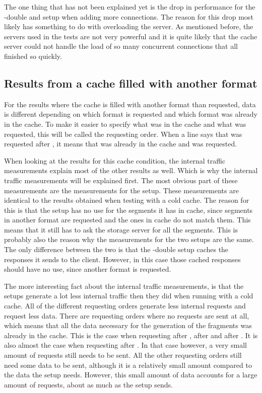 \documentclass[twoside,openright]{uva-bachelor-thesis}
\begin{document}
The one thing that has not been explained yet is the drop in performance for the
\lt-double and \cdn setup when adding more connections. The reason for this drop
most likely has something to do with overloading the server. As mentioned
before, the servers used in the tests are not very powerful and it is quite
likely that the cache server could not handle the load of so many concurrent
connections that all finished so quickly.

\subsection{Results from a cache filled with another format}
For the results where the cache is filled with another format than
requested, data is different depending on which format is requested and which
format was already in the cache. To make it easier to specify what was in the
cache and what was requested, this will be called the requesting order. When a
line says that \dash was requested after \iss, it means that \iss was already in
the cache and \dash was requested.

When looking at the results for this cache condition, the internal traffic
measurements explain most of the other results as well. Which is why the
internal traffic measurements will be explained first. The most obvious part of
these measurements are the measurements for the \cdn setup. These measurements
are identical to the results obtained when testing with a cold cache. The reason
for this is that the \cdn setup has no use for the segments it has in cache,
since segments in another format are requested and the ones in cache do not
match them. This means that it still has to ask the storage server for all the
segments. This is probably also the reason why the measurements for the two \lt
setups are the same. The only difference between the two is that the \lt-double
setup caches the responses it sends to the client. However, in this case those
cached responses should have no use, since another format is requested.

The more interesting fact about the internal traffic measurements, is that the
\lt setups generate a lot less internal traffic then they did when running with
a cold cache. All of the different requesting orders generate less internal
requests and request less data. There are requesting orders where no
requests are sent at all, which means that all the data necessary for the
generation of the fragments was already in the cache. This is the case when
requesting \dash after \iss, \iss after \dash and \hds after \hls. It is also
almost the case when requesting \hls after \hds. In that case however, a very
small amount of requests still needs to be sent. All the other requesting orders
still need some data to be sent, although it is a relatively small amount
compared to the data the \cdn setup needs. However, this small amount of data
accounts for a large amount of requests, about as much as the \cdn setup sends.
\end{document}
